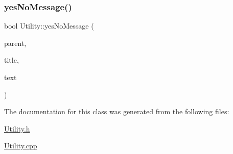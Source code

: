 \mbox{\label{class_utility_a80596645a3e837c0dc21ac15477c6095}} 
\subsubsection{\texorpdfstring{yes\+No\+Message()}{yesNoMessage()}}
{\footnotesize\ttfamily bool Utility\+::yes\+No\+Message (\begin{DoxyParamCaption}\item[{Q\+Widget $\ast$}]{parent,  }\item[{const Q\+String \&}]{title,  }\item[{const Q\+String \&}]{text }\end{DoxyParamCaption})\hspace{0.3cm}{\ttfamily [static]}}



The documentation for this class was generated from the following files\+:\begin{DoxyCompactItemize}
\item 
\hyperlink{_utility_8h}{Utility.\+h}\item 
\hyperlink{_utility_8cpp}{Utility.\+cpp}\end{DoxyCompactItemize}
